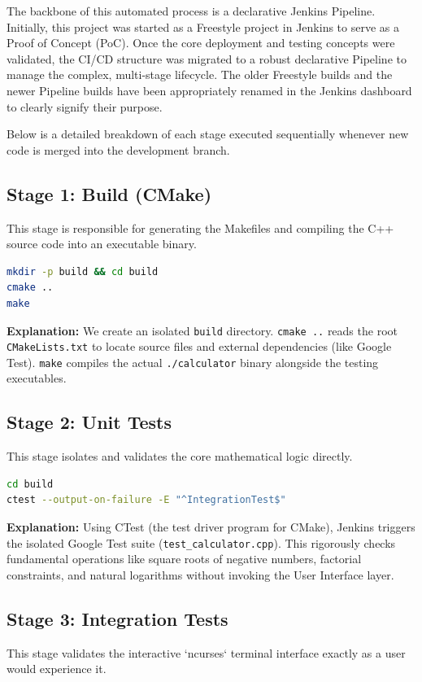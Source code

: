 \documentclass[12pt,a4paper]{article}
\begin{document}
The backbone of this automated process is a declarative Jenkins Pipeline. Initially, this project was started as a Freestyle project in Jenkins to serve as a Proof of Concept (PoC). Once the core deployment and testing concepts were validated, the CI/CD structure was migrated to a robust declarative Pipeline to manage the complex, multi-stage lifecycle. The older Freestyle builds and the newer Pipeline builds have been appropriately renamed in the Jenkins dashboard to clearly signify their purpose.

Below is a detailed breakdown of each stage executed sequentially whenever new code is merged into the development branch.

\subsection{Stage 1: Build (CMake)}
This stage is responsible for generating the Makefiles and compiling the C++ source code into an executable binary.

\begin{lstlisting}[language=bash]
mkdir -p build && cd build
cmake ..
make
\end{lstlisting}
\textbf{Explanation:} We create an isolated \texttt{build} directory. \texttt{cmake ..} reads the root \texttt{CMakeLists.txt} to locate source files and external dependencies (like Google Test). \texttt{make} compiles the actual \texttt{./calculator} binary alongside the testing executables.

\subsection{Stage 2: Unit Tests}
This stage isolates and validates the core mathematical logic directly.

\begin{lstlisting}[language=bash]
cd build
ctest --output-on-failure -E "^IntegrationTest$"
\end{lstlisting}
\textbf{Explanation:} Using CTest (the test driver program for CMake), Jenkins triggers the isolated Google Test suite (\texttt{test\_calculator.cpp}). This rigorously checks fundamental operations like square roots of negative numbers, factorial constraints, and natural logarithms without invoking the User Interface layer. 

\subsection{Stage 3: Integration Tests}
This stage validates the interactive `ncurses` terminal interface exactly as a user would experience it.
\end{document}

